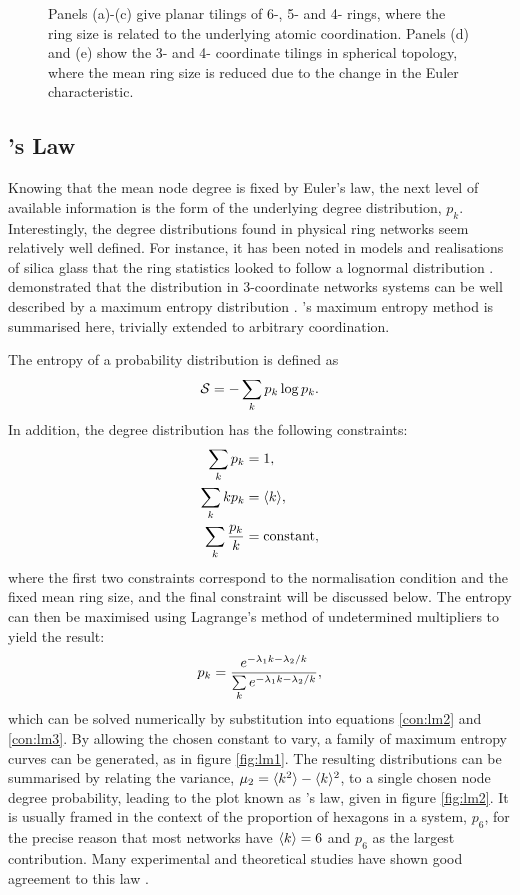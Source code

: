 \begin{figure}[bt]
     \caption{Panels (a)\--(c) give planar tilings of 6\--, 5\-- and 4\-- rings, where the ring size is related to the underlying atomic coordination. Panels (d) and (e) show the 3\-- and 4\-- coordinate tilings in spherical topology, where the mean ring size is reduced due to the change in the Euler characteristic.}
     \label{fig:lattices}
\end{figure}

\subsection{\lm's Law}
\label{s:lemaitre}

Knowing that the mean node degree is fixed by Euler's law, the next level of available information is the form of the underlying degree distribution, $p_k$.
Interestingly, the degree distributions found in physical ring networks seem relatively well defined.
For instance, it has been noted in models and realisations of \td{} silica glass that the ring statistics looked to follow a lognormal distribution \cite{Shackelford1981,Buchner2017}.
\lm{} \etal{} demonstrated that the distribution in 3-coordinate networks systems can be well described by a maximum entropy distribution \cite{Gervois1992}.
\lm's{} maximum entropy method is summarised here, trivially extended to arbitrary coordination.

The entropy of a probability distribution is defined as 
\begin{equation}
	\mathcal{S}=-\sum\limits_k p_k\log p_k. 
\end{equation}
In addition, the degree distribution has the following constraints:
\begin{align}
		\sum\limits_k p_k &=1, \\
		\sum\limits_k kp_k&=\langle k \rangle,  \label{con:lm2}\\
		\sum\limits_k \frac{p_k}{k}&=\text{constant} \label{con:lm3},
\end{align}
where the first two constraints correspond to the normalisation condition and the fixed mean ring size, and the final constraint will be discussed below.
The entropy can then be maximised using Lagrange's method of undetermined multipliers to yield the result:
\begin{equation}
	\label{eq:mepk}
	p_k = \frac{e^{-\lambda_1 k - \lambda_2 / k}}{\sum\limits_k e^{-\lambda_1 k - \lambda_2 / k}},
\end{equation}
which can be solved numerically by substitution into equations \eqref{con:lm2} and \eqref{con:lm3}. 
By allowing the chosen constant to vary, a family of maximum entropy curves can be generated, as in figure \ref{fig:lm1}.
The resulting distributions can be summarised by relating the variance, $\mu_2=\langle k^2 \rangle-\langle k \rangle^2$, to a single chosen node degree probability, leading to the plot known as \lm's law, given in figure \ref{fig:lm2}.
It is usually framed in the context of the proportion of hexagons in a system, $p_6$, for the precise reason that most networks have $\langle k \rangle=6$ and $p_6$ as the largest contribution.
Many experimental and theoretical studies have shown good agreement to this law \cite{Caer1993,Cerisier1996,Miklius2012}.

